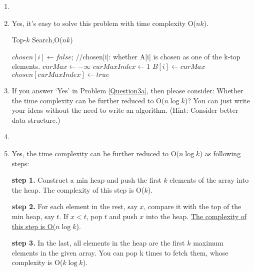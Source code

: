 \documentclass[12pt,a4paper]{article}
\makeatletter
\newtheorem*{solution}{Solution}
\theoremstyle{definition}
\renewenvironment{solution}[1][Solution] {\par\pushQED{\qed}\normalfont\topsep6\p@\@plus6\p@\relax\trivlist\item[\hskip\labelsep\bfseries#1\@addpunct{.}]\ignorespaces}{\popQED\endtrivlist\@endpefalse} \makeatother
\makeatother
\begin{document}
\begin{enumerate}
\begin{enumerate}
        \begin{solution}
        \item Yes, it's easy to solve this problem with time complexity O($nk$).

        \begin{minipage}[t]{0.94\textwidth}
        \begin{algorithm}[H]
        \label{Alg-topK}
        \BlankLine
        \caption{Top-$k$ Search,O($nk$)}
         {
            $chosen[i] \leftarrow false$;
            {\color{blue} //chosen[i]: whether A[i] is chosen as one of the k-top elements.}
        }
         {
            $curMax \leftarrow -\infty$\;
            $curMaxIndex \leftarrow 1$\;
             {
            }
            $B[i] \leftarrow curMax$\;
            $chosen[curMaxIndex] \leftarrow true$\;
        }
        \end{algorithm}
        \end{minipage}
        \end{solution}\newpage

    \item If you answer `Yes' in Problem \ref{Question3a}, then please consider: Whether the time complexity can be further reduced to O($n\log k$)? You can just write your ideas without the need to write an algorithm. {\color{blue}(Hint: Consider better data structure.)}
        \begin{solution}
        \item Yes, the time complexity can be further reduced to O($n\log k$) as following steps:

            \textbf{step 1.} Construct a min heap and push the first $k$ elements of the array into the heap. The complexity of this step is O($k$).

            \textbf{step 2.} For each element in the rest, say $x$, compare it with the top of the min heap, say $t$. If $x<t$, pop $t$ and push $x$ into the heap.
            \underline{The complexity of this step is O($n\log k$)}.

            \textbf{step 3.} In the last, all elements in the heap are the first $k$ maximum elements in the given array. You can pop k times to fetch them, whose complexity is O($k\log k$).


\end{solution}
\end{enumerate}
\end{enumerate}
\end{document}
